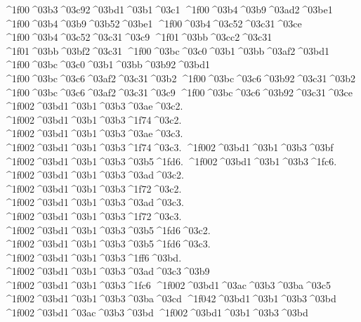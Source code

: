 {^^^^1f00^^^^03b3^^^^03c92^^^^03bd1^^^^03b1^^^^03c1
^^^^1f00^^^^03b4^^^^03b9^^^^03ad2^^^^03be1 		%
^^^^1f00^^^^03b4^^^^03b9^^^^03b52^^^^03be1
^^^^1f00^^^^03b4^^^^03c52^^^^03c31^^^^03ce 		%
^^^^1f00^^^^03b4^^^^03c52^^^^03c31^^^^03c9
^^^^1f01^^^^03bb^^^^03cc2^^^^03c31    		%
^^^^1f01^^^^03bb^^^^03bf2^^^^03c31
^^^^1f00^^^^03bc^^^^03c0^^^^03b1^^^^03bb^^^^03af2^^^^03bd1 		%
^^^^1f00^^^^03bc^^^^03c0^^^^03b1^^^^03bb^^^^03b92^^^^03bd1
^^^^1f00^^^^03bc^^^^03c6^^^^03af2^^^^03c31^^^^03b2 		%
^^^^1f00^^^^03bc^^^^03c6^^^^03b92^^^^03c31^^^^03b2
^^^^1f00^^^^03bc^^^^03c6^^^^03af2^^^^03c31^^^^03c9 		%
^^^^1f00^^^^03bc^^^^03c6^^^^03b92^^^^03c31^^^^03ce
^^^^1f002^^^^03bd1^^^^03b1^^^^03b3^^^^03ae^^^^03c2. 		%
^^^^1f002^^^^03bd1^^^^03b1^^^^03b3^^^^1f74^^^^03c2.
^^^^1f002^^^^03bd1^^^^03b1^^^^03b3^^^^03ae^^^^03c3.
^^^^1f002^^^^03bd1^^^^03b1^^^^03b3^^^^1f74^^^^03c3.
^^^^1f002^^^^03bd1^^^^03b1^^^^03b3^^^^03bf
^^^^1f002^^^^03bd1^^^^03b1^^^^03b3^^^^03b5^^^^1fd6.
^^^^1f002^^^^03bd1^^^^03b1^^^^03b3^^^^1fc6.
^^^^1f002^^^^03bd1^^^^03b1^^^^03b3^^^^03ad^^^^03c2.
^^^^1f002^^^^03bd1^^^^03b1^^^^03b3^^^^1f72^^^^03c2.
^^^^1f002^^^^03bd1^^^^03b1^^^^03b3^^^^03ad^^^^03c3.
^^^^1f002^^^^03bd1^^^^03b1^^^^03b3^^^^1f72^^^^03c3.
^^^^1f002^^^^03bd1^^^^03b1^^^^03b3^^^^03b5^^^^1fd6^^^^03c2.
^^^^1f002^^^^03bd1^^^^03b1^^^^03b3^^^^03b5^^^^1fd6^^^^03c3.
^^^^1f002^^^^03bd1^^^^03b1^^^^03b3^^^^1ff6^^^^03bd.
^^^^1f002^^^^03bd1^^^^03b1^^^^03b3^^^^03ad^^^^03c3^^^^03b9
^^^^1f002^^^^03bd1^^^^03b1^^^^03b3^^^^1fc6 
^^^^1f002^^^^03bd1^^^^03ac^^^^03b3^^^^03ba^^^^03c5 		%
^^^^1f002^^^^03bd1^^^^03b1^^^^03b3^^^^03ba^^^^03cd
^^^^1f042^^^^03bd1^^^^03b1^^^^03b3^^^^03bd  		%
^^^^1f002^^^^03bd1^^^^03ac^^^^03b3^^^^03bd 
^^^^1f002^^^^03bd1^^^^03b1^^^^03b3^^^^03bd   		%
}
